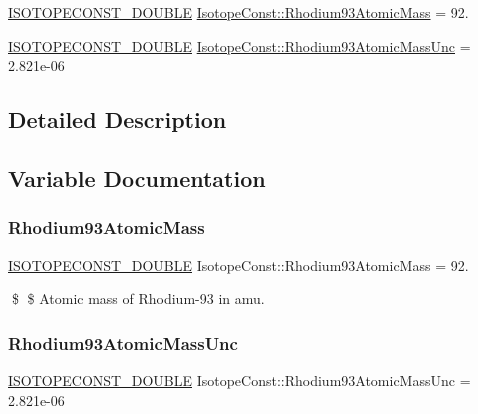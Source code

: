 \begin{DoxyCompactItemize}
\item 
\mbox{\hyperlink{group___isotope_const-_macros_ga8f45a7272ce02c0b4c65c44636ed719a}{I\+S\+O\+T\+O\+P\+E\+C\+O\+N\+S\+T\+\_\+\+D\+O\+U\+B\+LE}} \mbox{\hyperlink{group___isotope_const-_rhodium-_rh93_ga8c0dabc6f8e8bc666f293bb5f32f2733}{Isotope\+Const\+::\+Rhodium93\+Atomic\+Mass}} = 92.
\item 
\mbox{\hyperlink{group___isotope_const-_macros_ga8f45a7272ce02c0b4c65c44636ed719a}{I\+S\+O\+T\+O\+P\+E\+C\+O\+N\+S\+T\+\_\+\+D\+O\+U\+B\+LE}} \mbox{\hyperlink{group___isotope_const-_rhodium-_rh93_gacd8fd495b80e4ff7dd748957541d431d}{Isotope\+Const\+::\+Rhodium93\+Atomic\+Mass\+Unc}} = 2.\+821e-\/06
\end{DoxyCompactItemize}


\subsection{Detailed Description}


\subsection{Variable Documentation}
\mbox{\label{group___isotope_const-_rhodium-_rh93_ga8c0dabc6f8e8bc666f293bb5f32f2733}} 
\subsubsection{\texorpdfstring{Rhodium93\+Atomic\+Mass}{Rhodium93AtomicMass}}
{\footnotesize\ttfamily \mbox{\hyperlink{group___isotope_const-_macros_ga8f45a7272ce02c0b4c65c44636ed719a}{I\+S\+O\+T\+O\+P\+E\+C\+O\+N\+S\+T\+\_\+\+D\+O\+U\+B\+LE}} Isotope\+Const\+::\+Rhodium93\+Atomic\+Mass = 92.}

\$ \$ Atomic mass of Rhodium-\/93 in amu. \mbox{\label{group___isotope_const-_rhodium-_rh93_gacd8fd495b80e4ff7dd748957541d431d}} 
\subsubsection{\texorpdfstring{Rhodium93\+Atomic\+Mass\+Unc}{Rhodium93AtomicMassUnc}}
{\footnotesize\ttfamily \mbox{\hyperlink{group___isotope_const-_macros_ga8f45a7272ce02c0b4c65c44636ed719a}{I\+S\+O\+T\+O\+P\+E\+C\+O\+N\+S\+T\+\_\+\+D\+O\+U\+B\+LE}} Isotope\+Const\+::\+Rhodium93\+Atomic\+Mass\+Unc = 2.\+821e-\/06}

